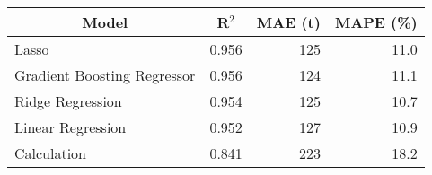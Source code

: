 
\begin{tabular}[t]{lrrr}
\toprule
\multicolumn{1}{c}{Model} & \multicolumn{1}{c}{R$^2$} & \multicolumn{1}{c}{MAE (t)} & \multicolumn{1}{c}{MAPE (\%)}\\
\midrule
Lasso & 0.956 & 125 & 11.0\\
Gradient Boosting Regressor & 0.956 & 124 & 11.1\\
Ridge Regression & 0.954 & 125 & 10.7\\
Linear Regression & 0.952 & 127 & 10.9\\
Calculation & 0.841 & 223 & 18.2\\
\bottomrule
\end{tabular}
